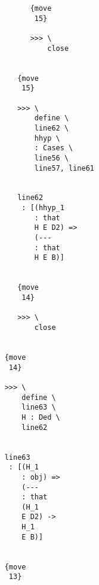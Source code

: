 \documentclass[12pt]{article}
\begin{document}
\begin{verbatim}
                                                {move 
                                                 15}

                                                >>> \
                                                    close


                                             {move 
                                              15}

                                             >>> \
                                                 define \
                                                 line62 \
                                                 hhyp \
                                                 : Cases \
                                                 line56 \
                                                 line57, line61


                                             line62 
                                              : [(hhyp_1 
                                                 : that 
                                                 H E D2) => 
                                                 (--- 
                                                 : that 
                                                 H E B)]


                                             {move 
                                              14}

                                             >>> \
                                                 close


                                          {move 
                                           14}

                                          >>> \
                                              define \
                                              line63 \
                                              H : Ded \
                                              line62


                                          line63 
                                           : [(H_1 
                                              : obj) => 
                                              (--- 
                                              : that 
                                              (H_1 
                                              E D2) -> 
                                              H_1 
                                              E B)]


                                          {move 
                                           13}


\end{verbatim}
\end{document}
